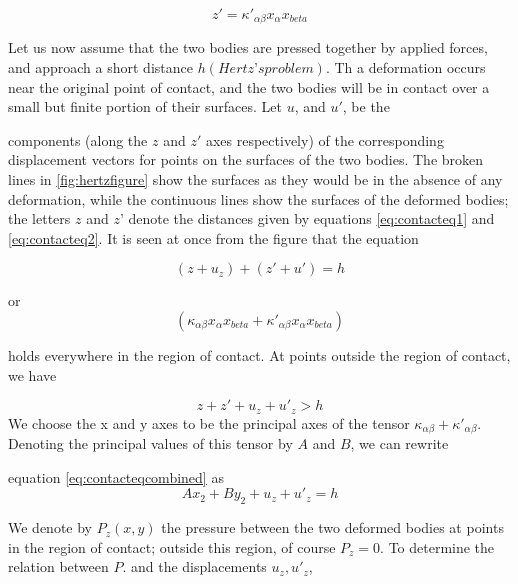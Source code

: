 \begin{equation}
z' = \kappa'_{\alpha\beta}x_{\alpha}x_{beta}
\label{eq:contacteq2}
\end{equation}

Let us now assume that the two bodies are pressed together by applied
forces, and approach a short distance $h(Hertz’s problem)$. Th a deformation occurs near the original point of contact, and the two bodies will be in contact over a small but finite portion of their surfaces. Let $u$, and $u'$, be the

components (along the $z$ and $z'$ axes respectively) of the corresponding displacement vectors for points on the surfaces of the two bodies. The broken lines in \ref{fig:hertzfigure} show the surfaces as they would be in the absence of any deformation, while the continuous lines show the surfaces of the deformed bodies; the letters $z$ and $z’$ denote the distances given by equations \ref{eq:contacteq1}
and \ref{eq:contacteq2}. It is seen at once from the figure that the equation

\begin{equation}
(z+u_{z}) + (z'+u') = h
\end{equation}

or 
\begin{equation}
(\kappa_{\alpha\beta}x_{\alpha}x_{beta} + \kappa'_{\alpha\beta}x_{\alpha}x_{beta})
\label{eq:contacteqcombined}
\end{equation}

holds everywhere in the region of contact. At points outside the region of
contact, we have

\begin{equation}
z+z'+u_{z}+u'_{z} > h
\end{equation}
We choose the x and y axes to be the principal axes of the tensor $\kappa_{\alpha\beta}+\kappa'_{\alpha\beta}$. Denoting the principal values of this tensor by $A$ and $B$, we can rewrite


equation \ref{eq:contacteqcombined} as
\begin{equation}
Ax_{2}+By_{2}+u_{z}+u'_{z} = h
\label{eq:rewriteAB}
\end{equation}

We denote by $P_{z}(x,y)$ the pressure between the two deformed bodies at points in the region of contact; outside this region, of course $P_{z} = 0$. To determine the relation between $P$. and the displacements $u_{z}, u'_{z}$,

